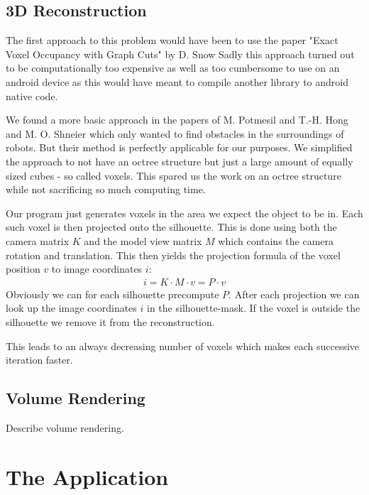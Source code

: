 \documentclass[10pt,twocolumn,letterpaper]{article}
\begin{document}
\subsection{3D Reconstruction}

The first approach to this problem would have been to use the paper "Exact Voxel Occupancy with Graph Cuts" by D. Snow \etal \cite{Snow} Sadly this approach turned out to be computationally too expensive as well as too cumbersome to use on an android device as this would have meant to compile another library to android native code.

We found a more basic approach in the papers of M. Potmesil \cite{Potmesil} and T.-H. Hong and M. O. Shneier \cite{Hong} which only wanted to find obstacles in the surroundings of robots. But their method is perfectly applicable for our purposes. We simplified the approach to not have an octree structure but just a large amount of equally sized cubes - so called voxels. This spared us the work on an octree structure while not sacrificing so much computing time.

Our program just generates voxels in the area we expect the object to be in. Each such voxel is then projected onto the silhouette. This is done using both the camera matrix $K$ and the model view matrix $M$ which contains the camera rotation and translation. This then yields the projection formula of the voxel position $v$ to image coordinates $i$:
\begin{align}
	i = K \cdot M \cdot v = P \cdot v
\end{align}
Obviously we can for each silhouette precompute $P$. After each projection we can look up the image coordinates $i$ in the silhouette-mask. If the voxel is outside the silhouette we remove it from the reconstruction.

This leads to an always decreasing number of voxels which makes each successive iteration faster.

\subsection{Volume Rendering}

Describe volume rendering.

\section{The Application}
\end{document}
